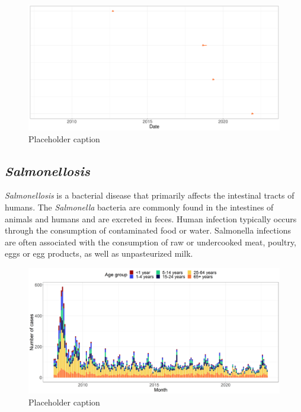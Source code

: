 \documentclass[a4paper,twoside,11pt]{report} %
\theoremstyle{definition}
\theoremstyle{definition}
\theoremstyle{definition}
\theoremstyle{definition}
\theoremstyle{remark}
\begin{document}
\begin{figure}[H]
\includegraphics[width=1\linewidth]{../figures/STEC_SSI_outbreaks} \caption{Placeholder caption}\label{fig:STECSSIoutbreaks}
\end{figure}

\subsection{\textit{Salmonellosis}}

\textit{Salmonellosis} is a bacterial disease that primarily affects the intestinal tracts of humans. The \textit{Salmonella} bacteria are commonly found in the intestines of animals and humans and are excreted in feces. Human infection typically occurs through the consumption of contaminated food or water. Salmonella infections are often associated with the consumption of raw or undercooked meat, poultry, eggs or egg products, as well as unpasteurized milk.



\begin{figure}[H]
\includegraphics[width=1\linewidth]{../figures/SALM_long_plot} \caption{Placeholder caption}\label{fig:SALMLongPlot}
\end{figure}
\end{document}
